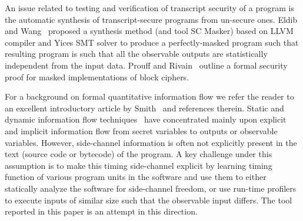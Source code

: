 An issue related to testing and verification of transcript security of
a program is the automatic synthesis of transcript-secure programs
from un-secure ones. Eldib and Wang~\cite{EW14} proposed a synthesis
method (and tool SC Masker) based on LLVM compiler and Yices SMT
solver to produce a perfectly-masked 
program such that resulting program is such that all the observable outputs are
statistically independent from the input data. 
Prouff and Rivain~\cite{PR13} outline a formal security proof for masked
implementations of block ciphers.      

For a background on formal quantitative information flow we refer the reader to
an excellent introductory article by Smith~\cite{smith09} and references therein.
Static and dynamic information flow techniques~\cite{SR10,Den76} have concentrated
mainly upon explicit and implicit information flow from secret variables to
outputs or observable variables.
However, side-channel information is often not explicitly present in the text
(source code or bytecode) of the program.
A key challenge under this assumption is to make this timing side-channel
explicit by learning timing function of various program units in the software
and use them to either statically analyze the software for side-channel freedom,
or use run-time profilers to execute inputs of similar size such that the
observable input differs.
The tool \jcupid reported in this paper is an attempt in this direction.




